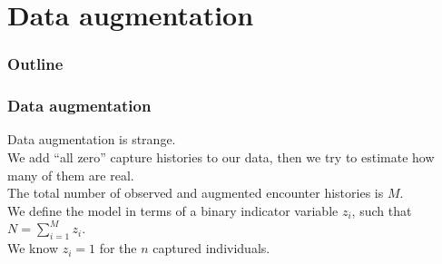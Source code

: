 \documentclass[color=usenames,dvipsnames]{beamer}\usepackage[]{graphicx}\usepackage[]{color}
\begin{document}
\section{Data augmentation}




\begin{frame}
  \frametitle{Outline}
  \Large
  \tableofcontents[currentsection]
\end{frame}



\begin{frame}
  \frametitle{Data augmentation}
  Data augmentation is strange. \\
  \pause
  \vfill
  We add ``all zero'' capture histories to our data, then we try to
  estimate how many of them are real. \\ 
  \pause
  \vfill
  The total number of observed and augmented encounter histories is
  $M$. \\
  \pause
  \vfill
  We define the model in terms of a binary indicator variable $z_i$,
  such that $N=\sum_{i=1}^M z_i$. \\
  \pause
  \vfill
  We know $z_i=1$ for the $n$ captured individuals. \\
\end{frame}
\end{document}
